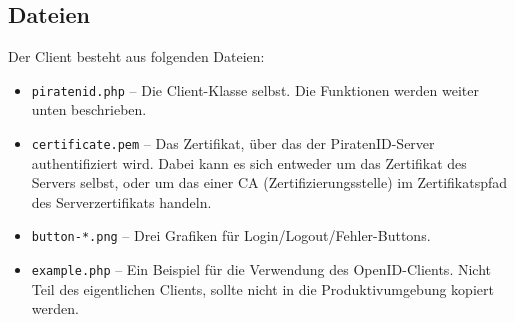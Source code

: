 \subsection{Dateien}
Der Client besteht aus folgenden Dateien:
\begin{itemize}
	\item \texttt{piratenid.php} --
		Die Client-Klasse selbst. Die Funktionen werden weiter unten beschrieben.
	\item \texttt{certificate.pem} -- 
		Das Zertifikat, über das der PiratenID-Server authentifiziert wird.
		Dabei kann es sich entweder um das Zertifikat des Servers selbst,
		oder um das einer CA (Zertifizierungsstelle) im Zertifikatspfad des Serverzertifikats handeln.
	\item \texttt{button-*.png} --
		Drei Grafiken für Login/Logout/Fehler-Buttons.
	\item \texttt{example.php} --
		Ein Beispiel für die Verwendung des OpenID-Clients. Nicht Teil des eigentlichen Clients, sollte nicht in die Produktivumgebung kopiert werden.
\end{itemize}

